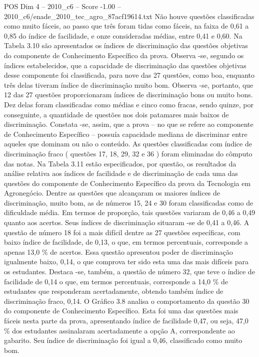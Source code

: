 \begin{textsample}{POS Dim 4 – 2010\_c6 – Score -1.00 – 2010\_c6/enade\_2010\_tec\_agro\_87acf19614.txt}
Não houve questões classificadas como muito fáceis, ao passo que três foram tidas como fáceis, na faixa de 0,61 a 0,85 do índice de facilidade, e onze consideradas médias, entre 0,41 e 0,60.
Na Tabela 3.10 são apresentados os índices de discriminação das questões objetivas do componente de Conhecimento Específico da prova.
Observa -se, segundo os índices estabelecidos, que a capacidade de discriminação das questões objetivas desse componente foi classificada, para nove das 27 questões, como boa, enquanto três delas tiveram índice de discriminação muito bom.
Observa -se, portanto, que 12 das 27 questões proporcionaram índices de discriminação bons ou muito bons.
Dez delas foram classificadas como médias e cinco como fracas, sendo quinze, por conseguinte, a quantidade de questões nos dois patamares mais baixos de discriminação.
Constata -se, assim, que a prova – no que se refere ao componente de Conhecimento Específico – possuía capacidade mediana de discriminar entre aqueles que dominam ou não o conteúdo.
As questões classificadas com índice de discriminação fraco ( questões 17, 18, 29, 32 e 36 ) foram eliminadas do cômputo das notas.
Na Tabela 3.11 estão especificados, por questão, os resultados da análise relativa aos índices de facilidade e de discriminação de cada uma das questões do componente de Conhecimento Específico da prova da Tecnologia em Agronegócio.
Dentre as questões que alcançaram os maiores índices de discriminação, muito bom, as de números 15, 24 e 30 foram classificadas como de dificuldade média.
Em termos de proporção, tais questões variaram de 0,46 a 0,49 quanto aos acertos.
Seus índices de discriminação situaram -se de 0,41 a 0,46.
A questão de número 18 foi a mais difícil dentre as 27 questões específicas, com baixo índice de facilidade, de 0,13, o que, em termos percentuais, corresponde a apenas 13,0 \% de acertos.
Essa questão apresentou poder de discriminação igualmente baixo, 0,14, o que comprova ter sido esta uma das mais difíceis para os estudantes.
Destaca -se, também, a questão de número 32, que teve o índice de facilidade de 0,14 o que, em termos percentuais, corresponde a 14,0 \% de estudantes que responderam acertadamente, obtendo também índice de discriminação fraco, 0,14.
O Gráfico 3.8 analisa o comportamento da questão 30 do componente de Conhecimento Específico.
Esta foi uma das questões mais fáceis nesta parte da prova, apresentando índice de facilidade 0,47, ou seja, 47,0 \% dos estudantes assinalaram acertadamente a opção A, correspondente ao gabarito.
Seu índice de discriminação foi igual a 0,46, classificado como muito bom.

\end{textsample}
